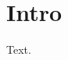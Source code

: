\documentclass{article}
\let\oldsection\section
\renewcommand\section[1]{\oldsection{#1}\noindent}
\begin{document}
\section{Intro}
Text.
\end{document}
